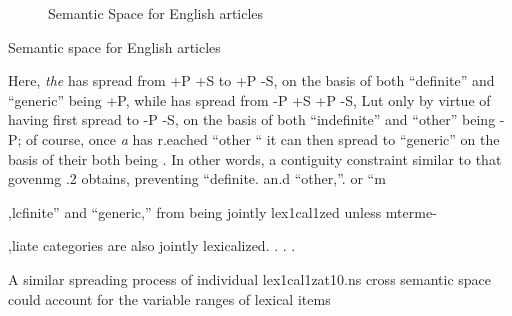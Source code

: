 \begin{figure}
\begin{center}
	\end{center}
	\caption{Semantic Space for English articles}\label{fig:4.4}
\end{figure}

Semantic space for English articles

Here, \textit{the} has spread from +P +S to +P -S, on the basis of both ``defi\-nite'' and ``generic'' being +P, while has spread from {}-P +S +P {}-S, Lut only by virtue of having first spread to {}-P {}-S, on the basis of both ``indefinite'' and ``other'' being {}-P; of course, once \textit{a} has r.eached ``other `` it can then spread to ``generic'' on the basis of their both being . In other words, a contiguity constraint similar to that goven\-mg .2 obtains, preventing ``definite{\textquotedbl}. an.d ``other,''. or ``m\-

,lcfinite'' and ``generic,'' from being jointly lex1cal1zed unless mterme-

,liate categories are also jointly lexicalized. . . .

A similar spreading process of individual lex1cal1zat10.ns cross semantic space could account for the variable ranges of lexical items

  


